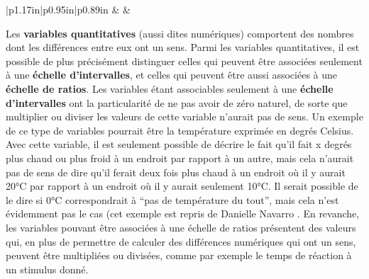 \documentclass[
  french,
]{book}
\begin{document}
\begin{longtable}[c]{|p{1.17in}|p{0.95in}|p{0.89in}}
 &  &  \\




\end{longtable}

Les \textbf{variables quantitatives} (aussi dites numériques) comportent des nombres dont les différences entre eux ont un sens. Parmi les variables quantitatives, il est possible de plus précisément distinguer celles qui peuvent être associées seulement à une \textbf{échelle d'intervalles}, et celles qui peuvent être aussi associées à une \textbf{échelle de ratios}. Les variables étant associables seulement à une \textbf{échelle d'intervalles} ont la particularité de ne pas avoir de zéro naturel, de sorte que multiplier ou diviser les valeurs de cette variable n'aurait pas de sens. Un exemple de ce type de variables pourrait être la température exprimée en degrés Celsius. Avec cette variable, il est seulement possible de décrire le fait qu'il fait x degrés plus chaud ou plus froid à un endroit par rapport à un autre, mais cela n'aurait pas de sens de dire qu'il ferait deux fois plus chaud à un endroit où il y aurait 20°C par rapport à un endroit où il y aurait seulement 10°C. Il serait possible de le dire si 0°C correspondrait à \enquote{pas de température du tout}, mais cela n'est évidemment pas le cas (cet exemple est repris de Danielle Navarro \autocite*{navarroLearningStatistics2018}. En revanche, les variables pouvant être associées à une échelle de ratios présentent des valeurs qui, en plus de permettre de calculer des différences numériques qui ont un sens, peuvent être multipliées ou divisées, comme par exemple le temps de réaction à un stimulus donné.
\end{document}
